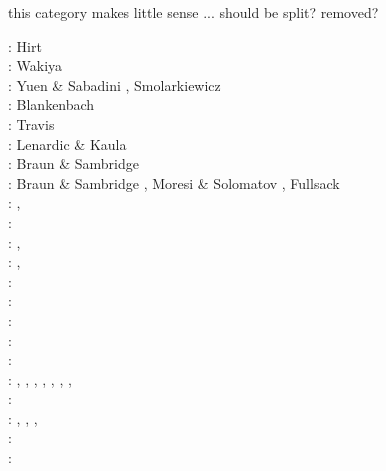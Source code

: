 {\color{red} this category makes little sense ... should be split? removed? }

\begin{scriptsize}
\nineteenseventyfour: Hirt \etal \cite{hiac74}\\
\nineteenseventyfive: Wakiya \cite{waki75a,waki75b}\\
\nineteeneightyfour: Yuen \& Sabadini \cite{yusa84}, Smolarkiewicz \cite{smol84}\\
\nineteeneightynine: Blankenbach \etal \cite{blbc89}\\
\nineteenninety: Travis \etal \cite{trab90}\\
\nineteenninetythree: Lenardic \& Kaula \cite{leka93}\\
\nineteenninetyfour: Braun \& Sambridge \cite{brsa94}\\
\nineteenninetyfive: Braun \& Sambridge \cite{brsa95}, Moresi \& Solomatov \cite{moso95}, 
                     Fullsack \cite{full95}\\
\nineteenninetysix: \cite{zhon96}, \cite{mozg96}\\
\nineteenninetyseven: \cite{rist97}\\
\nineteenninetynine: \cite{lind99}, \cite{bird99}\\
\twothousandone: \cite{modm01}, \cite{vank01}\\
\twothousandtwo: \cite{mudm02}\\
\twothousandthree: \cite{taki03}\cite{modm03}\cite{geyu03}\cite{geyu03b}\cite{taxi03}\cite{scpo03}\\
\twothousandfour: \cite{kaps04}\cite{kasa04}\cite{kaks08}\cite{mumc04}\\
\twothousandfive: \cite{mure05}\\
\twothousandsix: \cite{kapo06}\cite{more06}\cite{onmm06}\cite{mudm06}\cite{tact06}\\
\twothousandseven: 
\cite{toma07},
\cite{chcc07},
\cite{kabe07},
\cite{kaks07},
\cite{moql07},
\cite{geyu07},
\cite{dadh07},
\cite{zldf07}\\
\twothousandeight: \cite{zhmt08}\cite{deka08}\cite{trub08}\cite{krdp08}\cite{mamo08}\cite{gepd98}
      \cite{vack08}\cite{heta08}\cite{brtf08}\cite{daks08}\cite{chzy08}\cite{tack08}\cite{hust08b}\\
\twothousandnine: \cite{king09}, \cite{geum09}, \cite{vemm09}, 
                  \cite{qurj09}\\
\twothousandten: \cite{kaus10}\cite{kamm10}\cite{elga10}\cite{kilv10}\\
\twothousandeleven: \cite{dumg11}\cite{uibb11}\cite{hegc11}\cite{muso11}\cite{dawk11}\cite{lemm11}\\

\end{scriptsize}
